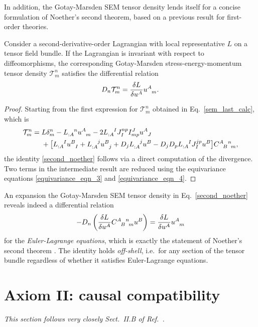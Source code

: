 In addition, the Gotay-Marsden SEM tensor density lends itself for a concise formulation of Noether's second theorem, based on a previous result \cite{Gotay_1992} for first-order theories.
\begin{theorem}\label{thm_second_noether}
  Consider a second-derivative-order Lagrangian with local representative $L$ on a tensor field bundle. If the Lagrangian is invariant with respect to diffeomorphisms, the corresponding Gotay-Marsden stress-energy-momentum tensor density $\mathcal T^n_m$ satisfies the differential relation
  \begin{equation}\label{second_noether}
    D_n \mathcal T^n_m = \frac{\delta L}{\delta u^A} u^A_{\hphantom Am}.
  \end{equation}
\end{theorem}
\begin{proof}
  Starting from the first expression for $\mathcal T^n_m$ obtained in Eq.~\eqref{sem_last_calc}, which is
  \begin{equation}
    \begin{aligned}
      \mathcal T^n_m = {} & L\delta^n_m - L_{:A}^{\hphantom{:A}n}u^A_{\hphantom Am} - 2 L_{:A}^{\hphantom{:A}I}J_I^{np} I^J_{mp} u^A_{\hphantom AJ} \\
      {} & + \big\lbrack L_{:A}^{\hphantom{:A}I}u^B_{\hphantom BI} + L_{:A}^{\hphantom{:A}j}u^B_{\hphantom Bj} + D_j L_{:A}^{\hphantom{:A}j}u^B - D_j D_p L_{:A}^{\hphantom{:A}I}J_I^{jp} u^B \big\rbrack\gmc{A}{B}{n}{m},
    \end{aligned}
  \end{equation}
  the identity \eqref{second_noether} follows via a direct computation of the divergence. Two terms in the intermediate result are reduced using the equivariance equations \eqref{equivariance_eqn_3} and \eqref{equivariance_eqn_4}.
\end{proof}
An expansion the Gotay-Marsden SEM tensor density in Eq.~\eqref{second_noether} reveals indeed a differential relation
\begin{equation}
  -D_n \left(\frac{\delta L}{\delta u^A}\gmc{A}{B}{n}{m}u^B\right) = \frac{\delta L}{\delta u^A} u^A_{\hphantom Am}
\end{equation}
for the \emph{Euler-Lagrange equations}, which is exactly the statement of Noether's second theorem \cite{}. The identity holds \emph{off-shell}, i.e.~for any section of the tensor bundle regardless of whether it satisfies Euler-Lagrange equations.

\section{Axiom II: causal compatibility}\label{sect_causal_compatibility}
\textit{This section follows very closely Sect.~II.B of Ref.~\cite{Alex_2020}.}

